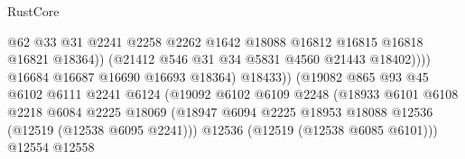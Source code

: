 \begin{lexlean}{RustCore}
\begin{coremodule}
                                                    @62
                                                    @33
                                                    @31
                                                    @2241
                                                    @2258
                                                    @2262
                                                    @1642
                                                    @18088
                                                    @16812
                                                    @16815
                                                    @16818
                                                    @16821
                                                    @18364))
                                                (@21412 @546 @31 @34 @5831 @4560 @21443 @18402))))
                                          @16684
                                          @16687
                                          @16690
                                          @16693
                                          @18364)
                                        @18433))
                                    (@19082
                                      @865
                                      @93
                                      @45
                                      @6102
                                      @6111
                                      @2241
                                      @6124
                                      (@19092
                                        @6102
                                        @6109
                                        @2248
                                        (@18933
                                          @6101
                                          @6108
                                          @2218
                                          @6084
                                          @2225
                                          @18069
                                          (@18947
                                            @6094
                                            @2225
                                            @18953
                                            @18088
                                            @12536
                                            (@12519 (@12538 @6095 @2241)))
                                          @12536
                                          (@12519 (@12538 @6085 @6101)))
                                        @12554
                                        @12558

\end{coremodule}
\end{lexlean}

